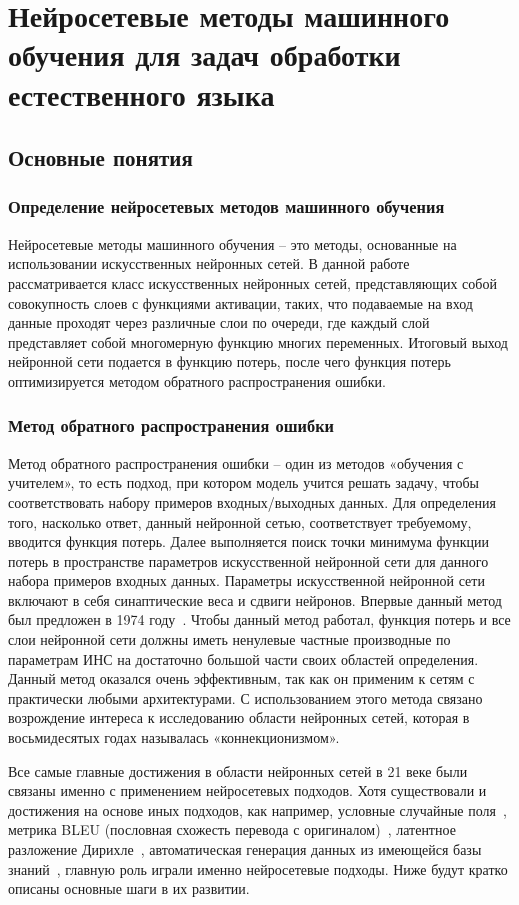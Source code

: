 \chapter{Нейросетевые методы машинного обучения для задач обработки естественного языка}\label{ch:nn} 
 
\section{Основные понятия}
\subsection{Определение нейросетевых методов машинного обучения}
Нейросетевые методы машинного обучения -- это методы, основанные на использовании искусственных нейронных сетей. В данной работе рассматривается класс искусственных нейронных сетей, представляющих собой совокупность слоев с функциями активации, таких, что подаваемые на вход данные проходят через различные слои по очереди, где каждый слой представляет собой многомерную функцию многих переменных. Итоговый выход нейронной сети подается в функцию потерь, после чего функция потерь оптимизируется методом обратного распространения ошибки. 
\subsection{Метод обратного распространения ошибки}
Метод обратного распространения ошибки -- один из методов «обучения с учителем», то есть подход, при котором модель учится решать задачу, чтобы соответствовать набору примеров входных/выходных данных. Для определения того, насколько ответ, данный нейронной сетью, соответствует требуемому, вводится функция потерь. Далее выполняется поиск точки минимума функции потерь в пространстве параметров искусственной нейронной сети для данного набора примеров входных данных. Параметры искусственной нейронной сети включают в себя синаптические веса и сдвиги нейронов. Впервые данный метод был предложен в 1974 году~\cite{werbos_1974}. Чтобы данный метод работал, функция потерь и все слои нейронной сети должны иметь ненулевые частные производные по параметрам ИНС на достаточно большой части своих областей определения.
Данный метод оказался очень эффективным, так как он применим к сетям с практически любыми архитектурами. С использованием этого метода связано возрождение интереса к исследованию области нейронных сетей, которая в восьмидесятых годах называлась «коннекционизмом». 

Все самые главные достижения в области нейронных сетей в 21 веке были связаны именно с применением нейросетевых подходов. Хотя существовали и достижения на основе иных подходов, как например, условные случайные поля~\cite{lafferty_2004}, метрика BLEU (пословная схожесть перевода с оригиналом)~\cite{papineni_2001}, латентное разложение Дирихле~\cite{blei_2003}, автоматическая генерация данных из имеющейся базы знаний~\cite{mintz_2009}, главную роль играли именно нейросетевые подходы. Ниже будут кратко описаны основные шаги в их развитии.

